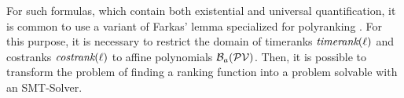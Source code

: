 For such formulas, which contain both existential and universal quantification, it is common to use a variant of Farkas' lemma \cite{schrijver1998theory} specialized for polyranking \cite{bradley2005polyranking}.
For this purpose, it is necessary to restrict the domain of timeranks $\emph{timerank}(\ell)$ and costranks $\emph{costrank}(\ell)$ to affine polynomials $\mathcal{B}_a(\mathcal{PV})$.
Then, it is possible to transform the problem of finding a ranking function into a problem solvable with an SMT-Solver.
